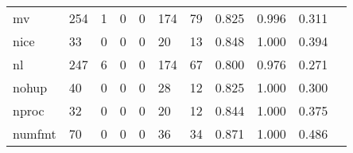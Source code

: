 \begin{longtable}{lp{1.2cm}p{1.2cm}p{1.2cm}p{1.2cm}p{1.2cm}p{1.2cm}p{1.2cm}p{1.2cm}p{1.2cm}p{1.2cm}}
mv        &                                   254 &                                                  1 &                                                  0 &                                                  0 &                                                174 &                                                 79 &                                              0.825 &                                              0.996 &                                              0.311 \\
nice      &                                    33 &                                                  0 &                                                  0 &                                                  0 &                                                 20 &                                                 13 &                                              0.848 &                                              1.000 &                                              0.394 \\
nl        &                                   247 &                                                  6 &                                                  0 &                                                  0 &                                                174 &                                                 67 &                                              0.800 &                                              0.976 &                                              0.271 \\
nohup     &                                    40 &                                                  0 &                                                  0 &                                                  0 &                                                 28 &                                                 12 &                                              0.825 &                                              1.000 &                                              0.300 \\
nproc     &                                    32 &                                                  0 &                                                  0 &                                                  0 &                                                 20 &                                                 12 &                                              0.844 &                                              1.000 &                                              0.375 \\
numfmt    &                                    70 &                                                  0 &                                                  0 &                                                  0 &                                                 36 &                                                 34 &                                              0.871 &                                              1.000 &                                              0.486 \\

\end{longtable}
